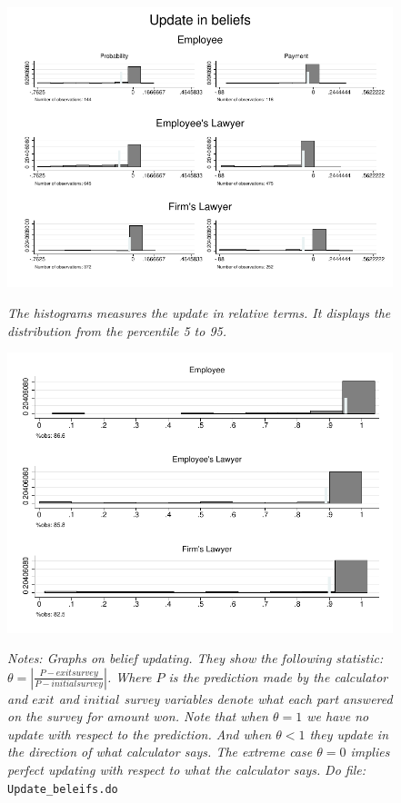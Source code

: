 \documentclass[12pt]{article}
\theoremstyle{named}
\begin{document}
\begin{figure}[H]
\label{update}
\begin{center}
\includegraphics[width=\textwidth]{./Figures/update_belief.pdf}
\end{center}
{\footnotesize \textit{The histograms measures the update in relative terms. It displays the distribution from the percentile 5 to 95.}}
\end{figure}

\pagebreak


\begin{figure}[H]
\label{update}
\begin{center}
\includegraphics[width=\textwidth]{./Figures/updatebeleif_amount.pdf}
\end{center}
{\footnotesize \textit{Notes: Graphs on belief updating. They show the following statistic: $\theta=\left|\frac{P-exitsurvey}{P-initialsurvey}\right|$. Where $P$ is the prediction made by the calculator and $exit$ and $initial$ survey variables denote what each part answered on the survey for amount won. Note that when $\theta=1$ we have no update with respect to the prediction. And when $\theta<1$ they update in the direction of what calculator says. The extreme case $\theta=0$ implies perfect updating with respect to what the calculator says. }}
{\footnotesize \textit{Do file: } \texttt{Update\_beleifs.do}}
\end{figure}
\end{document}
